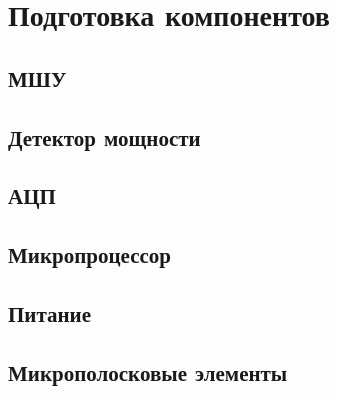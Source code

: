 \chapter{Подготовка компонентов}

\section{МШУ}


\section{Детектор мощности}


\section{АЦП}


\section{Микропроцессор}


\section{Питание}


\section{Микрополосковые элементы}



